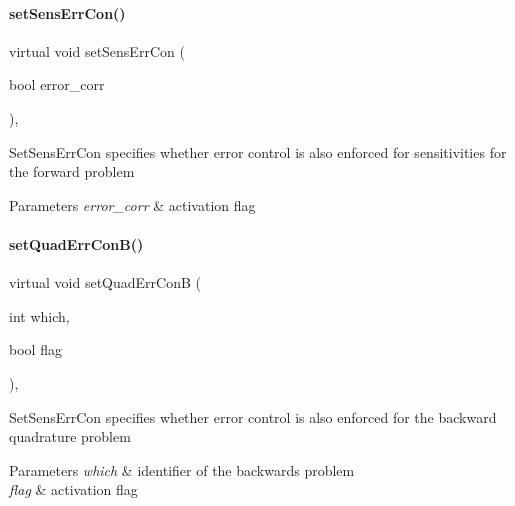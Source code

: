 \paragraph{\texorpdfstring{set\+Sens\+Err\+Con()}{setSensErrCon()}}
{\footnotesize\ttfamily virtual void set\+Sens\+Err\+Con (\begin{DoxyParamCaption}\item[{bool}]{error\+\_\+corr }\end{DoxyParamCaption})\hspace{0.3cm}{\ttfamily [protected]}, {}}

Set\+Sens\+Err\+Con specifies whether error control is also enforced for sensitivities for the forward problem


\begin{DoxyParams}{Parameters}
{\em error\+\_\+corr} & activation flag \\
\hline
\end{DoxyParams}
\mbox{\label{classamici_1_1_solver_a0d5e55201b30383f1272146935f43c78}} 
\paragraph{\texorpdfstring{set\+Quad\+Err\+Con\+B()}{setQuadErrConB()}}
{\footnotesize\ttfamily virtual void set\+Quad\+Err\+ConB (\begin{DoxyParamCaption}\item[{int}]{which,  }\item[{bool}]{flag }\end{DoxyParamCaption})\hspace{0.3cm}{\ttfamily [protected]}, {}}

Set\+Sens\+Err\+Con specifies whether error control is also enforced for the backward quadrature problem


\begin{DoxyParams}{Parameters}
{\em which} & identifier of the backwards problem \\
\hline
{\em flag} & activation flag \\
\hline
\end{DoxyParams}
\mbox{\label{classamici_1_1_solver_ab5e90e0ad8f195cd6ca2ce477cc734b7}} 
